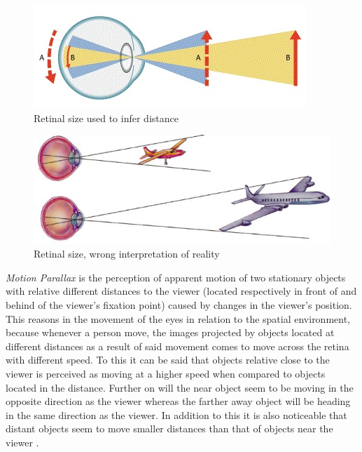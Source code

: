 \begin{figure}[h!]
   \centering
   \includegraphics[scale=0.7]{figures/cue6.jpg}
   \caption{Retinal size used to infer distance \cite{Perslides}}\label{fig:cue6}
\end{figure}

\begin{figure}[h!]
   \centering
   \includegraphics[scale=1]{figures/cue7.jpg}
   \caption{Retinal size, wrong interpretation of reality \cite{Psych}}\label{fig:cue7}
\end{figure}

\pagebreak
\textit{Motion Parallax} is the perception of apparent motion of two stationary objects with relative different distances to the viewer (located respectively in front of and behind of the viewer’s fixation point) caused by changes in the viewer’s position. This reasons in the movement of the eyes in relation to the spatial environment, because whenever a person move, the images projected by objects located at different distances as a result of said movement comes to move across the retina with different speed. To this it can be said that objects relative close to the viewer is perceived as moving at a higher speed when compared to objects located in the distance. Further on will the near object seem to be moving in the opposite direction as the viewer whereas the farther away object will be heading in the same direction as the viewer.  In addition to this it is also noticeable that distant objects seem to move smaller distances than that of objects near the viewer \cite{Gale} \cite{Shrestha2013} \cite{Skybrary}.

